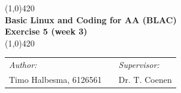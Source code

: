 \documentclass[a4paper]{article}
\begin{document}
\begin{center}
\line(1,0){420} \\
\huge \textbf{Basic Linux and Coding for AA (BLAC) \\ Exercise 5 (week 3)} \\
\line(1,0){420}
\end{center}

\vfill



\begin{table}[h]
\begin{center}
\begin{tabular}{lp{5cm}l}
\textit{Author:} & & \emph{Supervisor:} \\
Timo Halbesma, 6126561 & & Dr. T. Coenen\\
\end{tabular}
\end{center}
\end{table}


\newpage





\newpage
\end{document}
